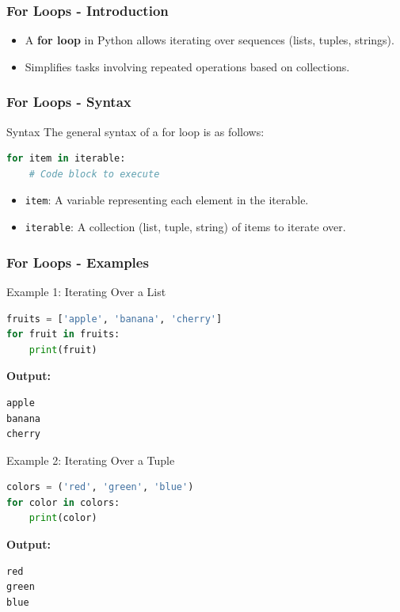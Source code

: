 \documentclass{beamer}
\begin{document}
\begin{frame}[fragile]
    \frametitle{For Loops - Introduction}
    \begin{itemize}
        \item A \textbf{for loop} in Python allows iterating over sequences (lists, tuples, strings).
        \item Simplifies tasks involving repeated operations based on collections.
    \end{itemize}
\end{frame}

\begin{frame}[fragile]
    \frametitle{For Loops - Syntax}
    \begin{block}{Syntax}
        The general syntax of a for loop is as follows:
        \begin{lstlisting}[language=Python]
for item in iterable:
    # Code block to execute
        \end{lstlisting}
    \end{block}
    \begin{itemize}
        \item \texttt{item}: A variable representing each element in the iterable.
        \item \texttt{iterable}: A collection (list, tuple, string) of items to iterate over.
    \end{itemize}
\end{frame}

\begin{frame}[fragile]
    \frametitle{For Loops - Examples}
    \begin{block}{Example 1: Iterating Over a List}
        \begin{lstlisting}[language=Python]
fruits = ['apple', 'banana', 'cherry']
for fruit in fruits:
    print(fruit)
        \end{lstlisting}
        \textbf{Output:}
        \begin{verbatim}
apple
banana
cherry
        \end{verbatim}
    \end{block}
    
    \begin{block}{Example 2: Iterating Over a Tuple}
        \begin{lstlisting}[language=Python]
colors = ('red', 'green', 'blue')
for color in colors:
    print(color)
        \end{lstlisting}
        \textbf{Output:}
        \begin{verbatim}
red
green
blue
        \end{verbatim}
    \end{block}
\end{frame}
\end{document}
